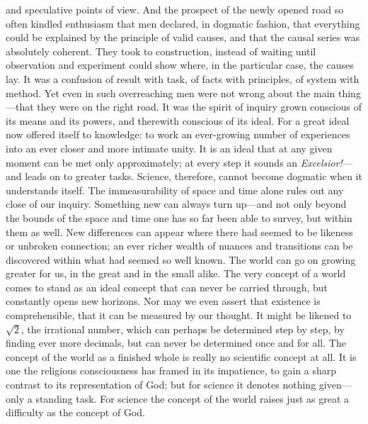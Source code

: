 \documentclass[12pt,a4paper]{article}
\newcommand{\opage}[1]{\marginnote{\footnotesize\textit{[#1]}}}
\begin{document}
and speculative points of view. And the prospect of the newly opened road so often
kindled enthusiasm that men declared, in dogmatic fashion, that everything could be
explained by the principle of valid causes, and that the causal series was absolutely
coherent. They took to construction, instead of waiting until observation and
experiment could show where, in the particular case, the causes lay. It was a
confusion of result with task, of facts with principles, of system with method. Yet
even \opage{19}in such overreaching men were not wrong about the main thing---that they were on
the right road. It was the spirit of inquiry grown conscious of its means and its
powers, and therewith conscious of its ideal. For a great ideal now offered itself to
knowledge: to work an ever-growing number of experiences into an ever closer and more
intimate unity. It is an ideal that at any given moment can be met only
approximately; at every step it sounds an \emph{Excelsior!}---and leads on to greater
tasks. Science, therefore, cannot become dogmatic when it understands itself. The
immeasurability of space and time alone rules out any close of our inquiry. Something
new can always turn up---and not only beyond the bounds of the space and time one has
so far been able to survey, but within them as well. New differences can appear where
there had seemed to be likeness or unbroken connection; an ever richer wealth of
nuances and transitions can be discovered within what had seemed so well known. The
world can go on growing greater for us, in the great and in the small alike. The very
concept of a world comes to stand as an ideal concept that can never be carried
through, but constantly opens new horizons. Nor may we even assert that existence is
comprehensible, that it can be measured by our thought. It might be likened to
$\sqrt{2}$, the irrational number, which can perhaps be determined step by step, by
finding ever more decimals, but can never be determined once and for all. The concept
of the world as a finished whole is really no scientific concept at all. It is one the
religious consciousness has framed in its impatience, to gain a sharp contrast to its
representation of God; but for science it denotes nothing given---only a standing task.
For \opage{20}science the concept of the world raises just as great a difficulty as the concept
of God.
\end{document}
